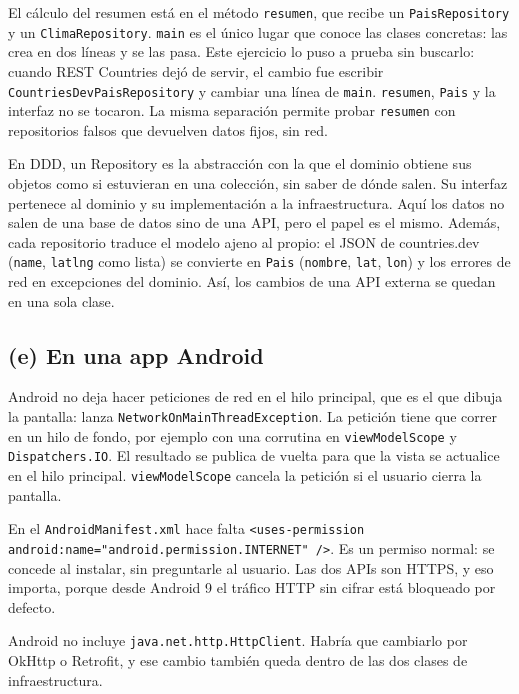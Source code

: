 \documentclass[11pt]{article}
\begin{document}
El cálculo del resumen está en el método \texttt{resumen}, que recibe un \texttt{PaisRepository} y un \texttt{ClimaRepository}. \texttt{main} es el único lugar que conoce las clases concretas: las crea en dos líneas y se las pasa. Este ejercicio lo puso a prueba sin buscarlo: cuando REST Countries dejó de servir, el cambio fue escribir \texttt{CountriesDevPaisRepository} y cambiar una línea de \texttt{main}. \texttt{resumen}, \texttt{Pais} y la interfaz no se tocaron. La misma separación permite probar \texttt{resumen} con repositorios falsos que devuelven datos fijos, sin red.

En DDD, un Repository es la abstracción con la que el dominio obtiene sus objetos como si estuvieran en una colección, sin saber de dónde salen. Su interfaz pertenece al dominio y su implementación a la infraestructura. Aquí los datos no salen de una base de datos sino de una API, pero el papel es el mismo. Además, cada repositorio traduce el modelo ajeno al propio: el JSON de countries.dev (\texttt{name}, \texttt{latlng} como lista) se convierte en \texttt{Pais} (\texttt{nombre}, \texttt{lat}, \texttt{lon}) y los errores de red en excepciones del dominio. Así, los cambios de una API externa se quedan en una sola clase.

\subsection*{(e) En una app Android}

\begin{description}
  \raggedright
  \item[El hilo.] Android no deja hacer peticiones de red en el hilo principal, que es el que dibuja la pantalla: lanza \texttt{NetworkOnMainThreadException}. La petición tiene que correr en un hilo de fondo, por ejemplo con una corrutina en \texttt{viewModelScope} y \texttt{Dispatchers.IO}. El resultado se publica de vuelta para que la vista se actualice en el hilo principal. \texttt{viewModelScope} cancela la petición si el usuario cierra la pantalla.
  \item[El permiso.] En el \texttt{AndroidManifest.xml} hace falta \texttt{<uses-permission android:name="android.permission.INTERNET" />}. Es un permiso normal: se concede al instalar, sin preguntarle al usuario. Las dos APIs son HTTPS, y eso importa, porque desde Android 9 el tráfico HTTP sin cifrar está bloqueado por defecto.
  \item[El cliente HTTP.] Android no incluye \texttt{java.net.http.HttpClient}. Habría que cambiarlo por OkHttp o Retrofit, y ese cambio también queda dentro de las dos clases de infraestructura.
\end{description}
\end{document}
